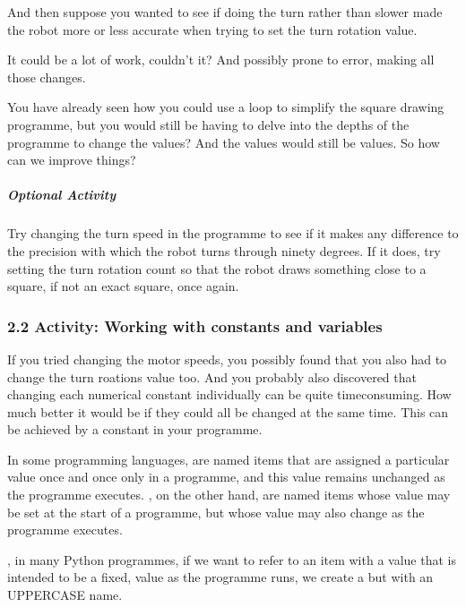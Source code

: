 \documentclass[letterpaper,10pt,english]{sphinxmanual}
\begin{document}
And then suppose you wanted to see if doing the turn  rather than slower made the robot more or less accurate when trying to set the turn rotation value.

It could be a lot of work, couldn’t it? And possibly prone to error, making all those changes.

You have already seen how you could use a loop to simplify the square drawing programme, but you would still be having to delve into the depths of the programme to change the values? And the values would still be  values. So how can we improve things?


\subparagraph{Optional Activity}
\label{\detokenize{content/01_Robot_Lab/Section_00_02:Optional-Activity}}
Try changing the turn speed in the programme to see if it makes any difference to the precision with which the robot turns through ninety degrees. If it does, try setting the turn rotation count so that the robot draws something close to a square, if not an exact square, once again.


\subsubsection{2.2 Activity: Working with constants and variables}
\label{\detokenize{content/01_Robot_Lab/Section_00_02:2.2-Activity:-Working-with-constants-and-variables}}
If you tried changing the motor speeds, you possibly found that you also had to change the turn roations value too. And you probably also discovered that changing each numerical constant individually can be quite time\sphinxhyphen{}consuming. How much better it would be if they could all be changed at the same time. This can be achieved by  a constant in your programme.

In some programming languages,  are named items that are assigned a particular value once and once only in a programme, and this value remains unchanged as the programme executes. , on the other hand, are named items whose value may be set at the start of a programme, but whose value may also change as the programme executes.

, in many Python programmes, if we want to refer to an item with a value that is intended to be a fixed,  value as the programme runs, we create a  but with an UPPERCASE name.
\end{document}

